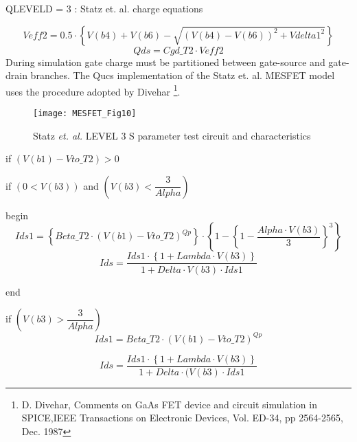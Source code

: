 QLEVELD = 3 : Statz et. al. charge equations

\begin{equation}
  Veff2 = 0.5 \cdot \left\lbrace V(b4) +V(b6) - \sqrt{(V(b4)-V(b6))^{2}+Vdelta1^{2}} \right\rbrace 
\end{equation}
\begin{equation}
  Qds = Cgd\_T2 \cdot Veff2
\end{equation}
During simulation gate charge must be partitioned between gate-source
and gate-drain branches. The Qucs implementation of the Statz
et. al. MESFET model uses the procedure adopted by Divehar
\footnote{D. Divehar, Comments on GaAs FET device and circuit
simulation in SPICE,IEEE Transactions on Electronic Devices,
Vol. ED-34, pp 2564-2565, Dec. 1987}.

\begin{figure} [h]
  \centering
  \texttt{[image: MESFET\_Fig10]}  
  \caption{Statz\textit{ et. al.} LEVEL 3 S parameter test circuit and characteristics} 
  \label{fig:fig10}
\end{figure} 

if $ (V(b1) - Vto\_T2) > 0$


\hspace{5mm} if $( 0 < V(b3) ) $  and $( V(b3) < \dfrac{3}{Alpha} )$


\hspace{10mm}    begin
		\begin{equation}
		 	Ids1 = \left\lbrace Beta\_T2 \cdot \left( V(b1)-Vto\_T2\right) ^{Qp}\right\rbrace \cdot \left\lbrace 1- \left\lbrace 1- \dfrac{Alpha \cdot V(b3)}{3}\right\rbrace ^{3}\right\rbrace 
		\end{equation}		
		\begin{equation}
 		Ids = \dfrac{ Ids1 \cdot \left\lbrace 1+Lambda \cdot V(b3) \right\rbrace}{1+Delta \cdot V(b3) \cdot Ids1} 
		\end{equation} 


\hspace{10mm}    end 

\hspace{5mm} if $( V(b3) > \dfrac{3}{Alpha} )$
		\begin{equation}
		 	Ids1 = Beta\_T2 \cdot \left( V(b1)-Vto\_T2\right) ^{Qp}
		\end{equation}

                \begin{equation}
 		Ids = \dfrac{ Ids1 \cdot \left\lbrace 1+Lambda \cdot V(b3) \right\rbrace } {1+Delta \cdot (V(b3) \cdot Ids1} 
		\end{equation} 



